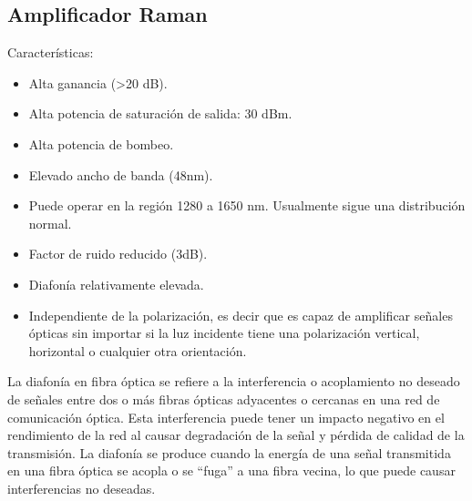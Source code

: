 \documentclass[
	12pt, %
	fleqn, %
	a4paper, %
	oneside, %
]{LegrandOrangeBook}
\begin{document}
\subsection{Amplificador Raman}
Características:
\begin{itemize}
\item Alta ganancia (>20 dB).
\item Alta potencia de saturación de salida: 30 dBm.
\item Alta potencia de bombeo.
\item Elevado ancho de banda (48nm).
\item Puede operar en la región 1280 a 1650 nm. Usualmente sigue una distribución normal.
\item Factor de ruido reducido (3dB).
\item Diafonía relativamente elevada.
\item Independiente de la polarización, es decir que es capaz de amplificar señales ópticas sin importar si la luz incidente tiene una polarización vertical, horizontal o cualquier otra orientación.
\end{itemize}
\begin{vocabulary}[Diafonía]
La diafonía en fibra óptica se refiere a la interferencia o acoplamiento no deseado de señales entre dos o más fibras ópticas adyacentes o cercanas en una red de comunicación óptica. Esta interferencia puede tener un impacto negativo en el rendimiento de la red al causar degradación de la señal y pérdida de calidad de la transmisión. La diafonía se produce cuando la energía de una señal transmitida en una fibra óptica se acopla o se ``fuga'' a una fibra vecina, lo que puede causar interferencias no deseadas.
\end{vocabulary}
\end{document}
